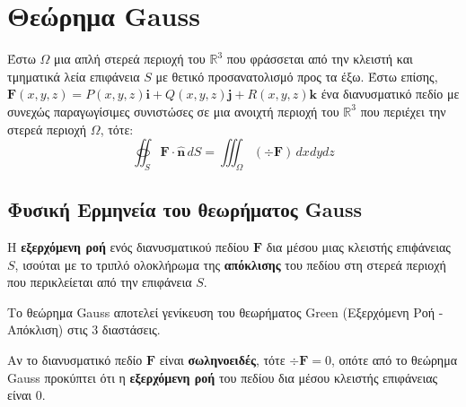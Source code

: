 \documentclass[a4paper,table]{report}
\begin{document}
\section*{Θεώρημα Gauss}

Έστω $\Omega$ μια απλή στερεά περιοχή του $ \mathbb{R}^{3} $ που φράσσεται από 
την κλειστή και τμηματικά λεία επιφάνεια $S$ με θετικό προσανατολισμό προς τα έξω.  
Έστω επίσης, 
$ \mathbf{F}(x,y,z) = P(x,y,z)\mathbf{i}+Q(x,y,z)\mathbf{j}+R(x,y,z)\mathbf{k} $ ένα 
διανυσματικό πεδίο με συνεχώς παραγωγίσιμες συνιστώσες σε μια ανοιχτή περιοχή του 
$ \mathbb{R}^{3} $ που περιέχει την στερεά περιοχή $\Omega$, τότε:
\[
  \oiint_{S} \mathbf{F} \cdot \mathbf{\widehat{n}} \,{dS} = \iiint_{\Omega} (\div
  \mathbf{F}) \,{dx}{dy}{dz}
\]

\subsection*{Φυσική Ερμηνεία του θεωρήματος Gauss}

Η \textbf{εξερχόμενη ροή} ενός διανυσματικού πεδίου $ \mathbf{F} $ δια μέσου μιας
κλειστής επιϕάνειας $S$, ισούται με το τριπλό ολοκλήρωμα της \textbf{απόκλισης} του 
πεδίου στη στερεά περιοχή που περικλείεται από την επιφάνεια $S$.

\begin{rems}
\item {}
  \begin{myitemize}
    \item Το θεώρημα Gauss αποτελεί γενίκευση του θεωρήματος Green (Εξερχόμενη Ροή -
      Απόκλιση) στις 3 διαστάσεις. 
    \item Αν το διανυσματικό πεδίο $ \mathbf{F} $ είναι \textbf{σωληνοειδές}, 
      τότε $ \div \mathbf{F} = 0 $, οπότε από το θεώρημα Gauss προκύπτει ότι 
      η \textbf{εξερχόμενη ροή} του πεδίου δια μέσου κλειστής επιφάνειας είναι 0.
  \end{myitemize}
\end{rems}
\end{document}
